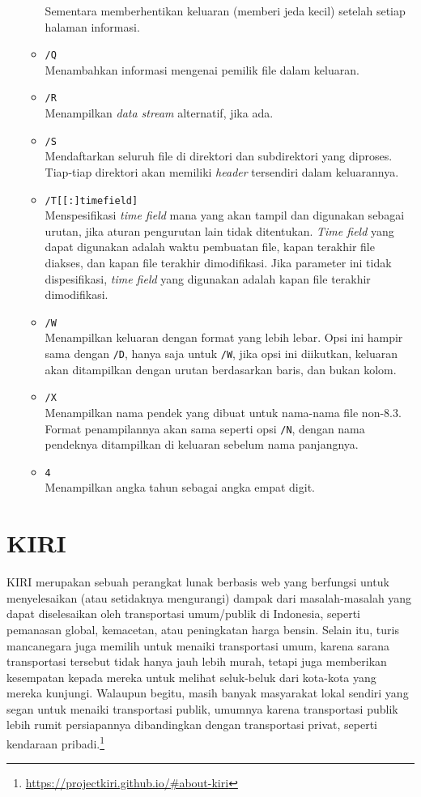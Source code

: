 \begin{itemize}
\begin{itemize}
		Sementara memberhentikan keluaran (memberi jeda kecil) setelah setiap halaman informasi.
		\item \verb|/Q|\\
		Menambahkan informasi mengenai pemilik file dalam keluaran.
		\item \verb|/R|\\
		Menampilkan \textit{data stream} alternatif, jika ada.
		\item \verb|/S|\\
		Mendaftarkan seluruh file di direktori dan subdirektori yang diproses. Tiap-tiap direktori akan memiliki \textit{header} tersendiri dalam keluarannya.
		\item \verb|/T[[:]timefield]|\\
		Menspesifikasi \textit{time field} mana yang akan tampil dan digunakan sebagai urutan, jika aturan pengurutan lain tidak ditentukan. \textit{Time field} yang dapat digunakan adalah waktu pembuatan file, kapan terakhir file diakses, dan kapan file terakhir dimodifikasi. Jika parameter ini tidak dispesifikasi, \textit{time field} yang digunakan adalah kapan file terakhir dimodifikasi.
		\item \verb|/W|\\
		Menampilkan keluaran dengan format yang lebih lebar. Opsi ini hampir sama dengan \verb|/D|, hanya saja untuk \verb|/W|, jika opsi ini diikutkan, keluaran akan ditampilkan dengan urutan berdasarkan baris, dan bukan kolom.
		\item \verb|/X|\\
		Menampilkan nama pendek yang dibuat untuk nama-nama file non-8.3. Format penampilannya akan sama seperti opsi \verb|/N|, dengan nama pendeknya ditampilkan di keluaran sebelum nama panjangnya.
		\item \verb|4|\\
		Menampilkan angka tahun sebagai angka empat digit.
	\end{itemize}
\end{itemize}

\section{KIRI}
\label{sec:kiri}

KIRI merupakan sebuah perangkat lunak berbasis web yang berfungsi untuk menyelesaikan (atau setidaknya mengurangi) dampak dari masalah-masalah yang dapat diselesaikan oleh transportasi umum/publik di Indonesia, seperti pemanasan global, kemacetan, atau peningkatan harga bensin. Selain itu, turis mancanegara juga memilih untuk menaiki transportasi umum, karena sarana transportasi tersebut tidak hanya jauh lebih murah, tetapi juga memberikan kesempatan kepada mereka untuk melihat seluk-beluk dari kota-kota yang mereka kunjungi. Walaupun begitu, masih banyak masyarakat lokal sendiri yang segan untuk menaiki transportasi publik, umumnya karena transportasi publik lebih rumit persiapannya dibandingkan dengan transportasi privat, seperti kendaraan pribadi.\footnote{\href{https://projectkiri.github.io/\#about-kiri}{https://projectkiri.github.io/\#about-kiri}}

